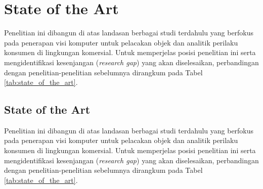 \section{State of the Art}

Penelitian ini dibangun di atas landasan berbagai studi terdahulu yang berfokus pada penerapan visi komputer untuk pelacakan objek dan analitik perilaku konsumen di lingkungan komersial. Untuk memperjelas posisi penelitian ini serta mengidentifikasi kesenjangan (\textit{research gap}) yang akan diselesaikan, perbandingan dengan penelitian-penelitian sebelumnya dirangkum pada Tabel \ref{tab:state_of_the_art}.

\subsection{State of the Art}

Penelitian ini dibangun di atas landasan berbagai studi terdahulu yang berfokus pada penerapan visi komputer untuk pelacakan objek dan analitik perilaku konsumen di lingkungan komersial. Untuk memperjelas posisi penelitian ini serta mengidentifikasi kesenjangan (\textit{research gap}) yang akan diselesaikan, perbandingan dengan penelitian-penelitian sebelumnya dirangkum pada Tabel \ref{tab:state_of_the_art}.

